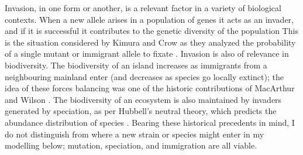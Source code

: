Invasion, in one form or another, is a relevant factor in a variety of biological contexts. 
When a new allele arises in a population of genes it acts as an invader, and if it is successful it contributes to the genetic diversity of the population
This is the situation considered by Kimura and Crow as they analyzed the probability of a single mutant or immigrant allele to fixate \cite{Crow1956,Kimura1964,Kimura1968}. 
Invasion is also of relevance in biodiversity. 
The biodiversity of an island increases as immigrants from a neighbouring mainland enter (and decreases as species go locally extinct); the idea of these forces balancing was one of the historic contributions of MacArthur and Wilson \cite{MacArthur1963,MacArthur1967a}. 
The biodiversity of an ecosystem is also maintained by invaders generated by speciation, as per Hubbell's neutral theory, which predicts the abundance distribution of species \cite{Hubbell2001}. 
%
Bearing these historical precedents in mind, I do not distinguish from where a new strain or species might enter in my modelling below; mutation, speciation, and immigration are all viable. 
